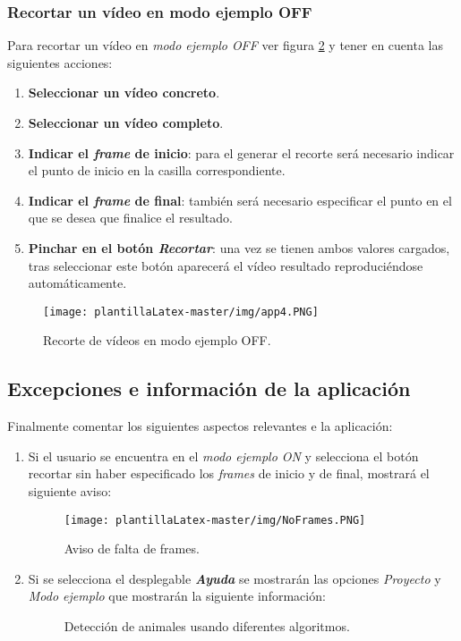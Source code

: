 \subsubsection{Recortar un vídeo en modo ejemplo OFF}
Para recortar un vídeo en \textit{modo ejemplo OFF} ver figura \ref{fig:app4} y tener en cuenta las siguientes acciones:
\begin{enumerate}
    \item \textbf{Seleccionar un vídeo concreto}.
    \item \textbf{Seleccionar un vídeo completo}.
    \item \textbf{Indicar el \textit{frame} de inicio}: para el generar el recorte será necesario indicar el punto de inicio en la casilla correspondiente.
    \item \textbf{Indicar el \textit{frame} de final}: también será necesario especificar el punto en el que se desea que finalice el resultado. 
    \item \textbf{Pinchar en el botón \textit{Recortar}}: una vez se tienen ambos valores cargados, tras seleccionar este botón aparecerá el vídeo resultado reproduciéndose automáticamente.
\end{enumerate}
\begin{figure}
    \centering
    \texttt{[image: plantillaLatex-master/img/app4.PNG]}
    \caption{Recorte de vídeos en modo ejemplo OFF.}
    \label{fig:app4}
\end{figure}

\subsection{Excepciones e información de la aplicación}
Finalmente comentar los siguientes aspectos relevantes e la aplicación:
\begin{enumerate}
    \item Si el usuario se encuentra en el \textit{modo ejemplo ON} y selecciona el botón recortar sin haber especificado los \textit{frames} de inicio y de final, mostrará el siguiente aviso:
    \begin{figure}[H]
        \centering
        \texttt{[image: plantillaLatex-master/img/NoFrames.PNG]}
        \caption{Aviso de falta de frames.}
    \label{fig:app4}
\end{figure}
    \item Si se selecciona el desplegable \textbf{\textit{Ayuda}} se mostrarán las opciones \textit{Proyecto} y \textit{Modo ejemplo} que mostrarán la siguiente información:
\begin{figure}[H]
 \centering
 \caption{Detección de animales usando diferentes algoritmos.}
 \label{f:animales1}
\end{figure}

    
\end{enumerate}
